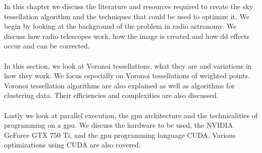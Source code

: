 In this chapter we discuss the literature and resources required to create the sky tessellation algorithm and the techniques that could be used to optimize it. We begin by looking at the background of the problem in radio astronomy. We discuss how radio telescopes work, how the image is created and how \gls{dd} effects occur and can be corrected.
\\
\\
In this section, we look at Voronoi tessellations, what they are and variations in how they work. We focus especially on Voronoi tessellations of weighted points. Voronoi tessellation algorithms are also explained as well as algorithms for clustering data. Their efficiencies and complexities are also discussed.
\\
\\
Lastly we look at parallel execution, the \gls{gpu} architecture and the technicalities of programming on a \gls{gpu}. We discuss the hardware to be used, the NVIDIA GeForce GTX 750 Ti, and the \gls{gpu} programming language CUDA. Various optimizations using CUDA are also covered.
